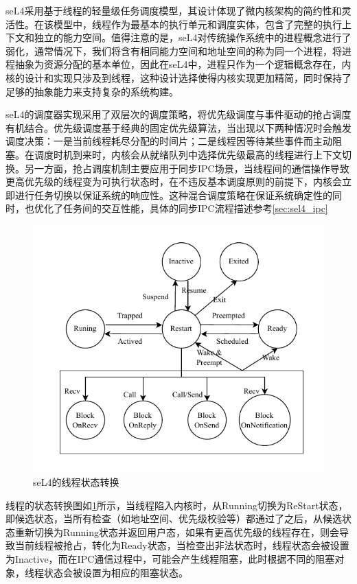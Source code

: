 seL4采用基于线程的轻量级任务调度模型，其设计体现了微内核架构的简约性和灵活性。在该模型中，线程作为最基本的执行单元和调度实体，包含了完整的执行上下文和独立的能力空间。值得注意的是，seL4对传统操作系统中的进程概念进行了弱化，通常情况下，我们将含有相同能力空间和地址空间的称为同一个进程，将进程抽象为资源分配的基本单位，因此在seL4中，进程只作为一个逻辑概念存在，内核的设计和实现只涉及到线程，这种设计选择使得内核实现更加精简，同时保持了足够的抽象能力来支持复杂的系统构建。

seL4的调度器实现采用了双层次的调度策略，将优先级调度与事件驱动的抢占调度有机结合。优先级调度基于经典的固定优先级算法，当出现以下两种情况时会触发调度决策：一是当前线程耗尽分配的时间片；二是线程因等待某些事件而主动阻塞。在调度时机到来时，内核会从就绪队列中选择优先级最高的线程进行上下文切换。另一方面，抢占调度机制主要应用于同步IPC场景，当线程间的通信操作导致更高优先级的线程变为可执行状态时，在不违反基本调度原则的前提下，内核会立即进行任务切换以保证系统的响应性。这种混合调度策略在保证系统确定性的同时，也优化了任务间的交互性能，具体的同步IPC流程描述参考\ref{sec:sel4_ipc}

\begin{figure}[htbp]
  \centering
  \includegraphics{figures/seL4_thread_state.drawio.pdf}
  \caption{seL4的线程状态转换}\label{fig:seL4_thread_state}
\end{figure}

线程的状态转换图如\ref{fig:seL4_thread_state}所示，当线程陷入内核时，从Running切换为ReStart状态，即候选状态，当所有检查（如地址空间、优先级校验等）都通过了之后，从候选状态重新切换为Running状态并返回用户态，如果有更高优先级的线程存在，则会导致当前线程被抢占，转化为Ready状态，当检查出非法状态时，线程状态会被设置为Inactive，而在IPC通信过程中，可能会产生线程阻塞，此时根据不同的阻塞对象，线程状态会被设置为相应的阻塞状态。


